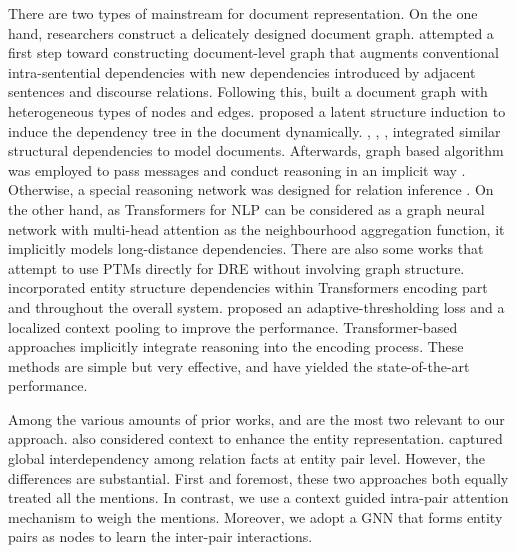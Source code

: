 \documentclass[11pt]{article}
\begin{document}
There are two types of mainstream for document representation.
On the one hand, researchers construct a delicately designed document graph.
\citet{quirk-poon-2017-distant} attempted a first step toward constructing document-level graph that augments conventional intra-sentential dependencies with new dependencies introduced by adjacent sentences and discourse relations.
Following this, \citet{christopoulou-etal-2019-connecting} built a document graph with heterogeneous types of nodes and edges.
\citet{nan-etal-2020-reasoning} proposed a latent structure induction to induce the dependency tree in the document dynamically.
\citet{wang-etal-2020-global}, \citet{zeng-etal-2020-double}, \citet{li-etal-2020-graph}, \citet{zhang-etal-2020-document} integrated similar structural dependencies to model documents.
Afterwards, graph based algorithm was employed to pass messages and conduct reasoning in an implicit way \cite{christopoulou-etal-2019-connecting}. 
Otherwise, a special reasoning network was designed for relation inference \cite{zeng-etal-2020-double,DBLP:conf/aaai/XuCZ21,li-etal-2021-mrn,xu-etal-2021-discriminative,zeng-etal-2021-sire}.
On the other hand, as Transformers for NLP can be considered as a graph neural network with multi-head attention as the neighbourhood aggregation function, it implicitly models long-distance dependencies.
There are also some works \cite{DBLP:journals/corr/abs-1909-11898, ye-etal-2020-coreferential} that attempt to use PTMs directly for DRE without involving graph structure.
\citet{DBLP:conf/aaai/XuWLZM21} incorporated entity structure dependencies within Transformers encoding part and throughout the overall system.
\citet{DBLP:conf/aaai/Zhou0M021} proposed an adaptive-thresholding loss and a localized context pooling to improve the performance.
Transformer-based approaches implicitly integrate reasoning into the encoding process.
These methods are simple but very effective, and have yielded the state-of-the-art performance.

Among the various amounts of prior works, \citet{DBLP:conf/aaai/Zhou0M021} and \citet{DBLP:conf/ijcai/ZhangCXDTCHSC21} are the most two relevant to our approach.
\citet{DBLP:conf/aaai/Zhou0M021} also considered context to enhance the entity representation.
\citet{DBLP:conf/ijcai/ZhangCXDTCHSC21} captured global interdependency among relation facts at entity pair level.
However, the differences are substantial.
First and foremost, these two approaches both equally treated all the mentions.
In contrast, we use a context guided intra-pair attention mechanism to weigh the mentions.
Moreover, we adopt a GNN that forms entity pairs as nodes to learn the inter-pair interactions.
\end{document}
